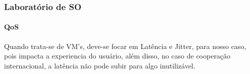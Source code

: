 \documentclass{beamer}
\begin{document}
\begin{frame}
\frametitle{Laboratório de SO}
\framesubtitle{QoS}

Quando trata\--se de VM's, deve\--se focar em Latência e Jitter, para nosso caso,
pois impacta a experiencia do usuário, além disso, no caso de cooperação internacional,
a latência não pode subir para algo inutilizável.

\begin{table}
  \centering
    \caption{Estimativas de QoS para a prototipagem de SO's.}
\end{table}
\end{frame}
\end{document}
